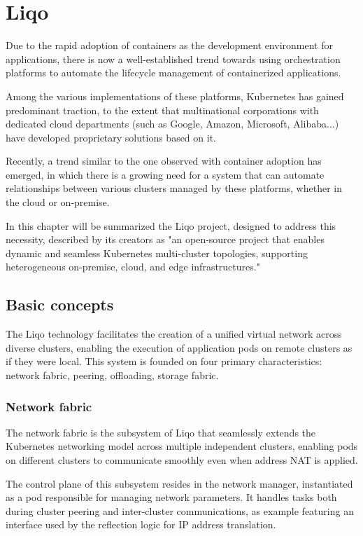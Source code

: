 \chapter{Liqo}
Due to the rapid adoption of containers as the development environment for applications, there is now a well-established trend towards using orchestration platforms to automate the lifecycle management of containerized applications. 

Among the various implementations of these platforms, Kubernetes has gained predominant traction, to the extent that multinational corporations with dedicated cloud departments (such as Google, Amazon, Microsoft, Alibaba...) have developed proprietary solutions based on it. 

Recently, a trend similar to the one observed with container adoption has emerged, in which there is a growing need for a system that can automate relationships between various clusters managed by these platforms, whether in the cloud or on-premise. 

In this chapter will be summarized the Liqo project, designed to address this necessity, described by its creators \cite{l0-1} as "an open-source project that enables dynamic and seamless Kubernetes multi-cluster topologies, supporting heterogeneous on-premise, cloud, and edge infrastructures."

\section{Basic concepts}
The Liqo technology facilitates the creation of a unified virtual network across diverse clusters, enabling the execution of application pods on remote clusters as if they were local. This system is founded on four primary characteristics: network fabric, peering, offloading, storage fabric.

\subsection{Network fabric}
The network fabric is the subsystem of Liqo that seamlessly extends the Kubernetes networking model across multiple independent clusters, enabling pods on different clusters to communicate smoothly even when address NAT is applied.

The control plane of this subsystem resides in the network manager, instantiated as a pod responsible for managing network parameters. It handles tasks both during cluster peering and inter-cluster communications, as example featuring an interface used by the reflection logic for IP address translation.

